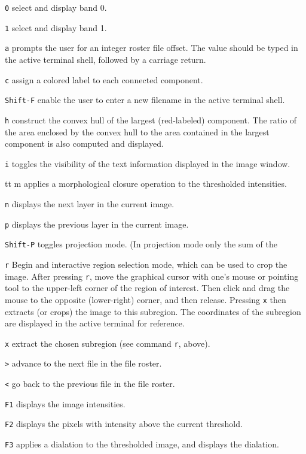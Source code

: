 \documentclass[10pt]{article}
\begin{document}
\begin{description}
\item{\tt 0} select and display band 0.
\item{\tt 1} select and display band 1.
\item{\tt a} prompts the user for an integer roster file offset. The value should be typed  in
the active terminal shell, followed by a carriage return.
\item{\tt c} assign a colored label to each connected component.
\item{\tt Shift-F} enable the user to enter a new filename in the active terminal shell.
\item{\tt h} construct the convex hull of the largest (red-labeled) component. The ratio of the area enclosed
by the convex hull to the area contained in the largest component is also computed and displayed.
\item{\tt i} toggles the visibility of the text information displayed in the image window.
\item{tt m} applies a morphological closure operation to the thresholded intensities. 
\item{\tt n} displays the next layer in the current image.
\item{\tt p} displays the previous layer in the current image.
\item{\tt Shift-P} toggles projection mode. (In projection mode only the sum of the
\item{\tt r} Begin and interactive region selection mode, which can be used to crop the image. After pressing {\tt r},
move the graphical cursor with one's mouse or pointing tool to the upper-left corner of the region of interest.
Then click and drag the mouse to the opposite (lower-right) corner, and then release. Pressing {\tt x} then extracts
(or crops) the image to this subregion. The coordinates of the subregion are displayed in the active terminal
for reference.
\item{\tt x} extract the chosen subregion (see command {\tt r}, above).
\item{\tt >} advance to the next file in the file roster.
\item{\tt <} go back to the previous file in the file roster.
\item{\tt F1} displays the image intensities.
\item{\tt F2} displays the pixels with intensity above the current threshold.
\item{\tt F3} applies a dialation to the thresholded image, and displays the dialation.

\end{description}
\end{document}

